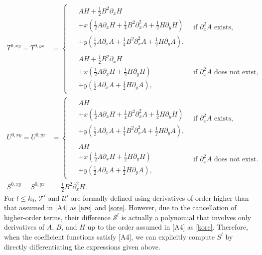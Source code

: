 \documentclass[a4paper,11pt]{jsarticle}
\begin{document}
\begin{align}
    T^{0,xy} = T^{0,yx} &= \begin{cases}
         \begin{aligned}
&  AH + \frac{1}{2} B^2 \partial_x H \\&+ x ( \frac{1}{2}A  \partial_x H  + \frac{1}{4} B^2 \partial_x^2 A + \frac{1}{2} H \partial_y H) \\ & + y (  \frac{1}{2}A \partial_x A + \frac{1}{4}B^2 \partial_x^2 A  +  \frac{1}{2}H \partial_y A),
\end{aligned} & \text{if } \partial_x^2 A \text{ exists,} \\    \begin{aligned}
&  AH + \frac{1}{2} B^2 \partial_x H \\&+ x ( \frac{1}{2}A  \partial_x H  + \frac{1}{2} H \partial_y H) \\ & + y (  \frac{1}{2}A \partial_x A  +   \frac{1}{2}H \partial_y A) 
,\end{aligned}&  \text{if } \partial_x^2 A \text{ does not exist,}
    \end{cases} \\   U^{0,xy} = U^{0,yx} &= \begin{cases}
         \begin{aligned}
&  AH \\&+ x ( \frac{1}{2}A  \partial_x H  + \frac{1}{4} B^2 \partial_x^2 A + \frac{1}{2} H \partial_y H) \\ & + y (  \frac{1}{2}A \partial_x A + \frac{1}{4}B^2 \partial_x^2 A  +  \frac{1}{2}H \partial_y A)
,\end{aligned} & \text{if } \partial_x^2 A \text{ exists,} \\    \begin{aligned}
&  AH\\&+ x ( \frac{1}{2}A  \partial_x H  + \frac{1}{2} H \partial_y H) \\ & + y (  \frac{1}{2}A \partial_x A  +   \frac{1}{2}H \partial_y A)
,\end{aligned}&  \text{if } \partial_x^2 A \text{ does not exist.}
    \end{cases} \\  S^{0,xy} = S^{0,yx} &= \frac{1}{2} B^2  \partial_x^2 H.
\end{align}
For $l \leq k_0$, $\mathscr{T}^l$ and $\mathscr{U}^l$ are formally defined using derivatives of order higher than that assumed in [A4] as $\eqref{are}$ and \eqref{sore}. However, due to the cancellation of higher-order terms, their difference $\mathscr{S}^l$ is actually a polynomial that involves only derivatives of $A$, $B$, and $H$ up to the order assumed in [A4] as \eqref{kore}. Therefore, when the coefficient functions satisfy [A4], we can explicitly compute $S^l$ by directly differentiating the expressions given above.
\end{document}
